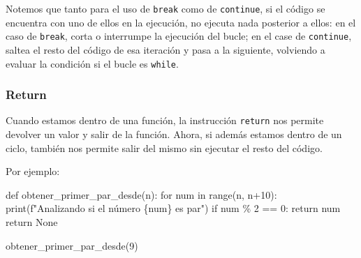 \documentclass[
  letterpaper,
  DIV=11,
  numbers=noendperiod]{scrreprt}
\newenvironment{Shaded}{\begin{snugshade}}{\end{snugshade}}
\newcommand{\BuiltInTok}[1]{\textcolor[rgb]{0.00,0.23,0.31}{#1}}
\newcommand{\ControlFlowTok}[1]{\textcolor[rgb]{0.00,0.23,0.31}{#1}}
\newcommand{\DecValTok}[1]{\textcolor[rgb]{0.68,0.00,0.00}{#1}}
\newcommand{\KeywordTok}[1]{\textcolor[rgb]{0.00,0.23,0.31}{#1}}
\newcommand{\NormalTok}[1]{\textcolor[rgb]{0.00,0.23,0.31}{#1}}
\newcommand{\OperatorTok}[1]{\textcolor[rgb]{0.37,0.37,0.37}{#1}}
\newcommand{\SpecialCharTok}[1]{\textcolor[rgb]{0.37,0.37,0.37}{#1}}
\newcommand{\SpecialStringTok}[1]{\textcolor[rgb]{0.13,0.47,0.30}{#1}}
\newcommand{\VariableTok}[1]{\textcolor[rgb]{0.07,0.07,0.07}{#1}}
\begin{document}
\begin{tcolorbox}[enhanced jigsaw, colframe=quarto-callout-note-color-frame, opacityback=0, opacitybacktitle=0.6, bottomrule=.15mm, toprule=.15mm, coltitle=black, breakable, colback=white, leftrule=.75mm, titlerule=0mm, bottomtitle=1mm, toptitle=1mm, rightrule=.15mm, title=\textcolor{quarto-callout-note-color}{\faInfo}\hspace{0.5em}{Note}, arc=.35mm, left=2mm, colbacktitle=quarto-callout-note-color!10!white]

Notemos que tanto para el uso de \texttt{break} como de
\texttt{continue}, si el código se encuentra con uno de ellos en la
ejecución, no ejecuta nada posterior a ellos: en el caso de
\texttt{break}, corta o interrumpe la ejecución del bucle; en el case de
\texttt{continue}, saltea el resto del código de esa iteración y pasa a
la siguiente, volviendo a evaluar la condición si el bucle es
\texttt{while}.

\end{tcolorbox}

\hypertarget{return}{%
\subsubsection{Return}\label{return}}

Cuando estamos dentro de una función, la instrucción \texttt{return} nos
permite devolver un valor y salir de la función. Ahora, si además
estamos dentro de un ciclo, también nos permite salir del mismo sin
ejecutar el resto del código.

Por ejemplo:

\begin{Shaded}
\begin{Highlighting}[]
\KeywordTok{def}\NormalTok{ obtener\_primer\_par\_desde(n):}
  \ControlFlowTok{for}\NormalTok{ num }\KeywordTok{in} \BuiltInTok{range}\NormalTok{(n, n}\OperatorTok{+}\DecValTok{10}\NormalTok{):}
    \BuiltInTok{print}\NormalTok{(}\SpecialStringTok{f"Analizando si el número }\SpecialCharTok{\{}\NormalTok{num}\SpecialCharTok{\}}\SpecialStringTok{ es par"}\NormalTok{)}
    \ControlFlowTok{if}\NormalTok{ num }\OperatorTok{\%} \DecValTok{2} \OperatorTok{==} \DecValTok{0}\NormalTok{:}
      \ControlFlowTok{return}\NormalTok{ num}
  \ControlFlowTok{return} \VariableTok{None}
\end{Highlighting}
\end{Shaded}

\begin{Shaded}
\begin{Highlighting}[]
\NormalTok{obtener\_primer\_par\_desde(}\DecValTok{9}\NormalTok{)}
\end{Highlighting}
\end{Shaded}
\end{document}
